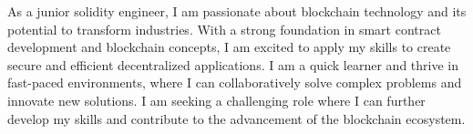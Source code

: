 

\begin{cvparagraph}


As a junior solidity engineer, I am passionate about blockchain technology and its potential to transform industries. With a strong foundation in smart contract development and blockchain concepts, I am excited to apply my skills to create secure and efficient decentralized applications. I am a quick learner and thrive in fast-paced environments, where I can collaboratively solve complex problems and innovate new solutions. I am seeking a challenging role where I can further develop my skills and contribute to the advancement of the blockchain ecosystem.

\end{cvparagraph}